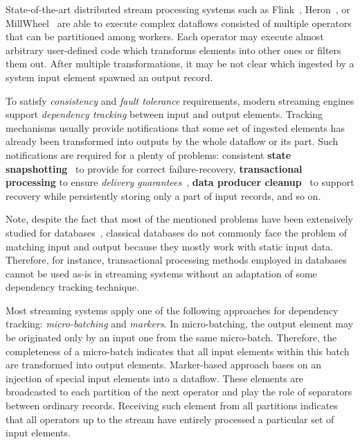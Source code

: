 \label {fs-acker-intro}

State-of-the-art distributed stream processing systems such as Flink~\cite{Carbone:2017:SMA:3137765.3137777}, Heron~\cite{Kulkarni:2015:THS:2723372.2742788}, or MillWheel~\cite{Akidau:2013:MFS:2536222.2536229} are able to execute complex dataflows consisted of multiple operators that can be partitioned among workers. Each operator may execute almost arbitrary user-defined code which transforms elements into other ones or filters them out. After multiple transformations, it may be not clear which ingested by a system input element spawned an output record. 

To satisfy {\em consistency} and {\em fault tolerance} requirements, modern streaming engines support {\em dependency tracking} between input and output elements. Tracking mechanisms usually provide notifications that some set of ingested elements has already been transformed into outputs by the whole dataflow or its part. Such notifications are required for a plenty of problems: consistent {\bf state snapshotting}~\cite{Akidau:2013:MFS:2536222.2536229, 2015arXiv150608603C} to provide for correct failure-recovery, {\bf transactional processing} to ensure {\em delivery guarantees}~\cite{thepaper, Carbone:2017:SMA:3137765.3137777}, {\bf data producer cleanup}~\cite{Noghabi:2017:SSS:3137765.3137770} to support recovery while persistently storing only a part of input records, and so on. 

Note, despite the fact that most of the mentioned problems have been extensively studied for databases~\cite{DBLP:books/mk/WeikumV2002}, classical databases do not commonly face the problem of matching input and output because they mostly work with static input data. Therefore, for instance, transactional processing methods employed in databases cannot be used as-is in streaming systems without an adaptation of some dependency tracking technique.

Most streaming systems apply one of the following approaches for dependency tracking: {\em micro-batching} and {\em markers}. In micro-batching, the output element may be originated only by an input one from the same micro-batch. Therefore, the completeness of a micro-batch indicates that all input elements within this batch are transformed into output elements. Marker-based approach bases on an injection of special input elements into a dataflow. These elements are broadcasted to each partition of the next operator and play the role of separators between ordinary records. Receiving such element from all partitions indicates that all operators up to the stream have entirely processed a particular set of input elements. 

